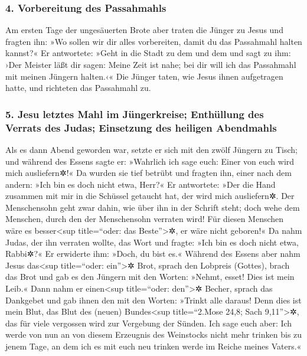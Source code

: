\hypertarget{vorbereitung-des-passahmahls}{%
\subsubsection{4. Vorbereitung des
Passahmahls}\label{vorbereitung-des-passahmahls}}

 Am ersten Tage der ungesäuerten Brote aber traten die
Jünger zu Jesus und fragten ihn: »Wo sollen wir dir alles vorbereiten,
damit du das Passahmahl halten kannst?«  Er antwortete:
»Geht in die Stadt zu dem und dem und sagt zu ihm: ›Der Meister läßt dir
sagen: Meine Zeit ist nahe; bei dir will ich das Passahmahl mit meinen
Jüngern halten.‹«  Die Jünger taten, wie Jesus ihnen
aufgetragen hatte, und richteten das Passahmahl zu.

\hypertarget{jesu-letztes-mahl-im-juxfcngerkreise-enthuxfcllung-des-verrats-des-judas-einsetzung-des-heiligen-abendmahls}{%
\subsubsection{5. Jesu letztes Mahl im Jüngerkreise; Enthüllung des
Verrats des Judas; Einsetzung des heiligen
Abendmahls}\label{jesu-letztes-mahl-im-juxfcngerkreise-enthuxfcllung-des-verrats-des-judas-einsetzung-des-heiligen-abendmahls}}

 Als es dann Abend geworden war, setzte er sich mit den
zwölf Jüngern zu Tisch;  und während des Essens sagte er:
»Wahrlich ich sage euch: Einer von euch wird mich ausliefern✲!«
 Da wurden sie tief betrübt und fragten ihn, einer nach
dem andern: »Ich bin es doch nicht etwa, Herr?«  Er
antwortete: »Der die Hand zusammen mit mir in die Schüssel getaucht hat,
der wird mich ausliefern✲.  Der Menschensohn geht zwar
dahin, wie über ihn in der Schrift steht; doch wehe dem Menschen, durch
den der Menschensohn verraten wird! Für diesen Menschen wäre es
besser\textless sup title=``oder: das Beste''\textgreater✲, er wäre
nicht geboren!«  Da nahm Judas, der ihn verraten wollte,
das Wort und fragte: »Ich bin es doch nicht etwa, Rabbi✲?« Er erwiderte
ihm: »Doch, du bist es.«  Während des Essens aber nahm
Jesus das\textless sup title=``oder: ein''\textgreater✲ Brot, sprach den
Lobpreis (Gottes), brach das Brot und gab es den Jüngern mit den Worten:
»Nehmt, esset! Dies ist mein Leib.«  Dann nahm er
einen\textless sup title=``oder: den''\textgreater✲ Becher, sprach das
Dankgebet und gab ihnen den mit den Worten: »Trinkt alle daraus!
 Denn dies ist mein Blut, das Blut des (neuen)
Bundes\textless sup title=``2.Mose 24,8; Sach 9,11''\textgreater✲, das
für viele vergossen wird zur Vergebung der Sünden.  Ich
sage euch aber: Ich werde von nun an von diesem Erzeugnis des Weinstocks
nicht mehr trinken bis zu jenem Tage, an dem ich es mit euch neu trinken
werde im Reiche meines Vaters.«

